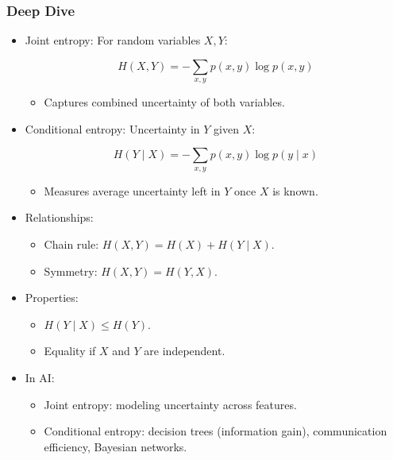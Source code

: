 \documentclass[
  letterpaper,
  DIV=11,
  numbers=noendperiod]{scrreprt}
\providecommand{\tightlist}{%
  \setlength{\itemsep}{0pt}\setlength{\parskip}{0pt}}
\begin{document}
\subsubsection{Deep Dive}\label{deep-dive-161}

\begin{itemize}
\item
  Joint entropy: For random variables \(X, Y\):

  \[
  H(X, Y) = -\sum_{x,y} p(x,y) \log p(x,y)
  \]

  \begin{itemize}
  \tightlist
  \item
    Captures combined uncertainty of both variables.
  \end{itemize}
\item
  Conditional entropy: Uncertainty in \(Y\) given \(X\):

  \[
  H(Y \mid X) = -\sum_{x,y} p(x,y) \log p(y \mid x)
  \]

  \begin{itemize}
  \tightlist
  \item
    Measures average uncertainty left in \(Y\) once \(X\) is known.
  \end{itemize}
\item
  Relationships:

  \begin{itemize}
  \tightlist
  \item
    Chain rule: \(H(X, Y) = H(X) + H(Y \mid X)\).
  \item
    Symmetry: \(H(X, Y) = H(Y, X)\).
  \end{itemize}
\item
  Properties:

  \begin{itemize}
  \tightlist
  \item
    \(H(Y \mid X) \leq H(Y)\).
  \item
    Equality if \(X\) and \(Y\) are independent.
  \end{itemize}
\item
  In AI:

  \begin{itemize}
  \tightlist
  \item
    Joint entropy: modeling uncertainty across features.
  \item
    Conditional entropy: decision trees (information gain),
    communication efficiency, Bayesian networks.
  \end{itemize}
\end{itemize}
\end{document}
